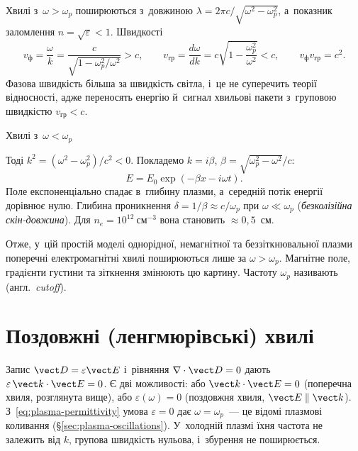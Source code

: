 Хвилі з~$\omega>\omega_p$ поширюються з~довжиною $\lambda=2\pi
c/\sqrt{\omega^2-\omega_p^2}$, а~показник заломлення $n=\sqrt\varepsilon<1$. Швидкості
\begin{equation*}
	v_{\mathrm{ф}}=\frac\omega k=\frac c{\sqrt{1-\omega_p^2/\omega^2}}>c,\qquad
	v_{\mathrm{гр}}=\frac{d\omega}{dk}=c\sqrt{1-\frac{\omega_p^2}{\omega^2}}<c,\qquad
	v_{\mathrm{ф}}v_{\mathrm{гр}}=c^2.
\end{equation*}
Фазова швидкість більша за швидкість світла, і~це не суперечить теорії відносності, адже
переносять енергію й~сигнал хвильові пакети з~груповою швидкістю $v_{\mathrm{гр}}<c$.

Хвилі з~$\omega<\omega_p$

Тоді $k^2=(\omega^2-\omega_p^2)/c^2<0$. Покладемо $k=i\beta$,
$\beta=\sqrt{\omega_p^2-\omega^2}/c$:
\begin{equation*}
	E=E_0\exp(-\beta x-i\omega t).
\end{equation*}
Поле експоненціально спадає в~глибину плазми, а~середній потік енергії дорівнює нулю.
Глибина проникнення $\delta=1/\beta\approx c/\omega_p$ при $\omega\ll\omega_p$
(\emph{безколізійна скін-довжина}). Для $n_e=10^{12}~\mathrm{см}^{-3}$ вона становить
$\approx0{,}5$~см.

Отже, у~цій простій моделі однорідної, немагнітної та беззіткнювальної плазми поперечні
електромагнітні хвилі поширюються лише за $\omega>\omega_p$. Магнітне поле, градієнти
густини та зіткнення змінюють цю картину. Частоту $\omega_p$ називають  (англ.~\emph{cutoff}).



\section{Поздовжні (ленгмюрівські) хвилі}\label{sec:langmuir-waves}



Запис $\vect D=\varepsilon\vect E$ і~рівняння $\nabla\cdot\vect D=0$ дають
$\varepsilon\,\vect k\cdot\vect E=0$. Є дві можливості: або $\vect k\cdot\vect E=0$
(поперечна хвиля, розглянута вище), або $\varepsilon(\omega)=0$ (поздовжня хвиля, $\vect
E\parallel\vect k$). З~\eqref{eq:plasma-permittivity} умова $\varepsilon=0$ дає
$\omega=\omega_p$~--- це відомі плазмові коливання (§\ref{sec:plasma-oscillations}).
У~холодній плазмі їхня частота не залежить від $k$, групова швидкість нульова, і~збурення
не поширюється.

